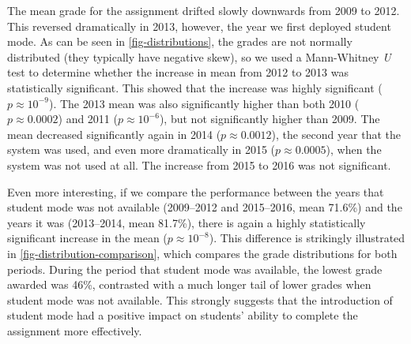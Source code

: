 \documentclass[sigconf, authordraft, capitalise]{acmart}
\begin{document}
The mean grade for the assignment drifted slowly downwards from 2009 to 2012. This reversed dramatically in 2013, however, the year we first deployed student mode. As can be seen in \cref{fig-distributions}, the grades are not normally distributed (they typically have negative skew), so we used a Mann-Whitney \emph{U} test to determine whether the increase in mean from 2012 to 2013 was statistically significant. This showed that the increase was highly significant (\(p \approx 10^{-9}\)). The 2013 mean was also significantly higher than both 2010 (\(p \approx 0.0002\)) and 2011 (\(p \approx 10^{-6}\)), but not significantly higher than 2009. The mean decreased significantly again in 2014 (\(p \approx 0.0012\)), the second year that the system was used, and even more dramatically in 2015 (\(p \approx 0.0005\)), when the system was not used at all. The increase from 2015 to 2016 was not significant.

Even more interesting, if we compare the performance between the years that student mode was not available (2009--2012 and 2015--2016, mean 71.6\%) and the years it was (2013--2014, mean 81.7\%), there is again a highly statistically significant increase in the mean (\(p \approx 10^{-8}\)). This difference is strikingly illustrated in \cref{fig-distribution-comparison}, which compares the grade distributions for both periods. During the period that student mode was available, the lowest grade awarded was 46\%, contrasted with a much longer tail of lower grades when student mode was not available. This strongly suggests that the introduction of student mode had a positive impact on students' ability to complete the assignment more effectively.
\end{document}

